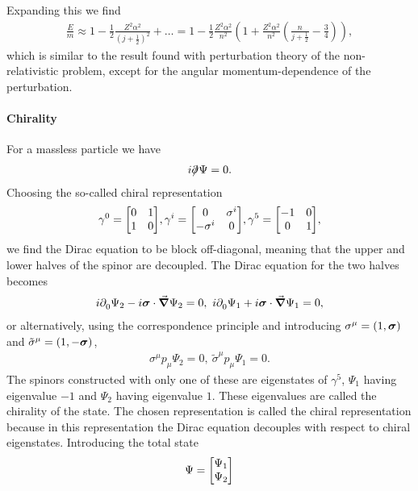 Expanding this we find
\begin{align*}
	\frac{E}{m} \approx 1 - \frac{1}{2}\frac{Z^{2}\alpha^{2}}{\left(j + \frac{1}{2}\right)^{2}} + \dots = 1 - \frac{1}{2}\frac{Z^{2}\alpha^{2}}{n^{2}}\left(1 + \frac{Z^{2}\alpha^{2}}{n^{2}}\left(\frac{n}{j + \frac{1}{2}} - \frac{3}{4}\right)\right),
\end{align*}
which is similar to the result found with perturbation theory of the non-relativistic problem, except for the angular momentum-dependence of the perturbation.

\paragraph{Chirality}
For a massless particle we have
\begin{align*}
	i\slashed{\partial^{}_{}}\Psi = 0.
\end{align*}
Choosing the so-called chiral representation
\begin{align*}
	\gamma^{0} = \mqty[
		0 & 1 \\
		1 & 0
	], \gamma^{i} = \mqty[
		0           & \sigma^{i} \\
		-\sigma^{i} & 0
	],\gamma^{5} = \mqty[
		-1 & 0 \\
		0  & 1
	],
\end{align*}
we find the Dirac equation to be block off-diagonal, meaning that the upper and lower halves of the spinor are decoupled. The Dirac equation for the two halves becomes
\begin{align*}
	i\del{}{0}\Psi_{2} - i\vb*{\sigma}\cdot\grad\Psi_{2} = 0,\ i\del{}{0}\Psi_{1} + i\vb*{\sigma}\cdot\grad\Psi_{1} = 0,
\end{align*}
or alternatively, using the correspondence principle and introducing $\sigma^{\mu} = (1, \vb*{\sigma})$ and $\tilde{\sigma}^{\mu} = (1, -\vb*{\sigma})$,
\begin{align*}
	\sigma^{\mu}p_{\mu}\Psi_{2} = 0,\ \tilde{\sigma}^{\mu}p_{\mu}\Psi_{1} = 0.
\end{align*}
The spinors constructed with only one of these are eigenstates of $\gamma^{5}$, $\Psi_{1}$ having eigenvalue $-1$ and $\Psi_{2}$ having eigenvalue $1$. These eigenvalues are called the chirality of the state. The chosen representation is called the chiral representation because in this representation the Dirac equation decouples with respect to chiral eigenstates. Introducing the total state
\begin{align*}
	\Psi = \mqty[
		\Psi_{1} \\
		\Psi_{2}
	]
\end{align*}
